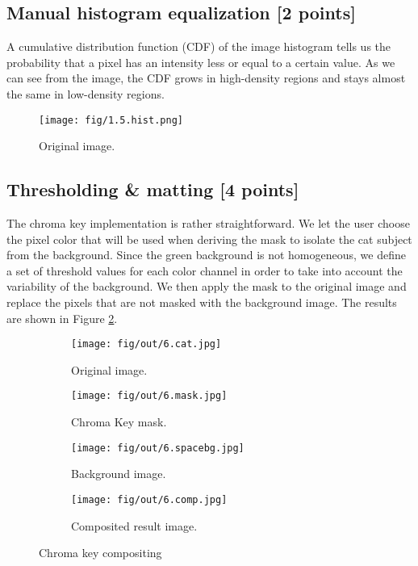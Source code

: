 \documentclass[tikz,14pt,fleqn]{article}
\begin{document}
\subsection{Manual histogram equalization [2 points]}
A cumulative distribution function (CDF) of the image histogram tells us the probability that a pixel has an intensity less or equal to a certain value. As we can see from the image, the CDF grows in high-density regions and stays almost the same in low-density regions. 
\begin{figure}
    \centering
    \texttt{[image: fig/1.5.hist.png]}
    \caption{Original image.}
\end{figure}

\subsection{Thresholding \& matting [4 points]}
The chroma key implementation is rather straightforward. We let the user choose the pixel color that will be used when deriving the mask to isolate the cat subject from the background. Since the green background is not homogeneous, we define a set of threshold values for each color channel in order to take into account the variability of the background. We then apply the mask to the original image and replace the pixels that are not masked with the background image. The results are shown in Figure \ref{fig:6.comp}. 
\begin{figure}[h!]
    \begin{center}
    \begin{subfigure}{0.22\textwidth}
        \centering
        \texttt{[image: fig/out/6.cat.jpg]}
        \caption{Original image.}
    \end{subfigure}
    \begin{subfigure}{0.22\textwidth}
        \centering
        \texttt{[image: fig/out/6.mask.jpg]}
        \caption{Chroma Key mask.}
    \end{subfigure}
    \begin{subfigure}{0.22\textwidth}
        \centering
        \texttt{[image: fig/out/6.spacebg.jpg]}
        \caption{Background image.}
    \end{subfigure}

    \begin{subfigure}{.67\textwidth}
        \centering
        \texttt{[image: fig/out/6.comp.jpg]}
        \caption{Composited result image.}
        \label{fig:6.comp}
    \end{subfigure}
\end{center}
    \caption{Chroma key compositing}
\end{figure}
\end{document}
